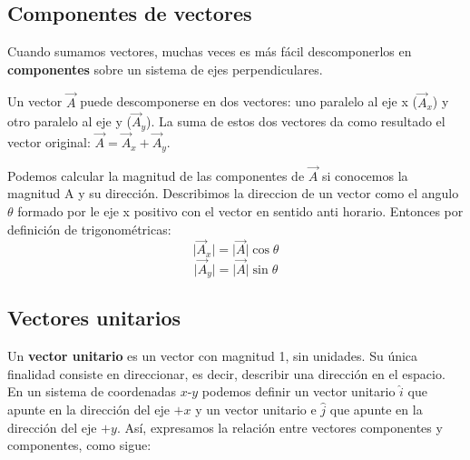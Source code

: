 \documentclass{article}
\newcommand{\newsubsection}[1]{
    \vspace{0.5cm}
    \color{sectionColor}
    \subsection{ #1}
    \color{black}
    \vspace{0.5cm}
}
\newcommand{\bl}[1]{\textbf{#1}}
\begin{document}

    \newsubsection{Componentes de vectores}

    \par Cuando sumamos vectores, muchas veces es más fácil descomponerlos en \bl{componentes} sobre un sistema de ejes perpendiculares.
    \par Un vector \(\vec{A}\) puede descomponerse en dos vectores: uno paralelo al eje x (\(\vec{A}_x\)) y otro paralelo al eje y (\(\vec{A}_y\)). La suma de estos dos vectores da como resultado el vector original: \(\vec{A}=\vec{A}_x+\vec{A}_y\).

    \begin{figure}[H]
        \centering
        \shorthandoff{>}
        \shorthandon{>}
    \end{figure}

    \par Podemos calcular la magnitud de las componentes de $\vec{A}$ si conocemos la magnitud A y su dirección. Describimos la direccion de un vector como el angulo $\theta$ formado por le eje x positivo con el vector en sentido anti horario. Entonces por definición de trigonométricas:
    \[ \lvert \vec{A}_x \rvert = \lvert \vec{A} \rvert \cos \theta \]
    \[ \lvert \vec{A}_y \rvert = \lvert \vec{A} \rvert \sin \theta \]

    \newsubsection{Vectores unitarios}

    \par Un \bl{vector unitario} es un vector con magnitud 1, sin unidades. Su única ﬁnalidad consiste en direccionar, es decir, describir una dirección en el espacio. En un sistema de coordenadas $x$-$y$ podemos deﬁnir un vector unitario $\hat{i}$ que apunte en la dirección del eje $+x$ y un vector unitario e $\hat{j}$ que apunte en la dirección del eje $+y$. Así, expresamos la relación entre vectores componentes y componentes, como sigue:
\end{document}
